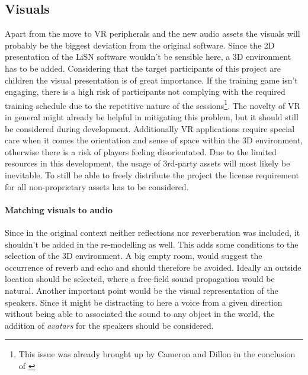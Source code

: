 \documentclass[a4paper,11pt]{article}%
\renewcommand{\\}{\vspace*{0.5\baselineskip} \newline}
\begin{document}
\subsection{Visuals}
\label{sec:visuals}
Apart from the move to \ac{VR} peripherals and the new audio assets the visuals will probably be the biggest deviation from the original software. Since the 2D presentation of the \ac{LiSN} software wouldn't be sensible here, a 3D environment has to be added.
\newline
\newline
Considering that the target participants of this project are children the visual presentation is of great importance. If the training game isn't engaging, there is a high risk of participants not complying with the required training schedule due to the repetitive nature of the sessions\footnote{This issue was already brought up by Cameron and Dillon in the conclusion of \cite{LiSN-B}}.
\newline
\newline
The novelty of \ac{VR} in general might already be helpful in mitigating this problem, but it should still be considered during development. Additionally \ac{VR} applications require special care when it comes the orientation and sense of space within the 3D environment, otherwise there is a risk of players feeling disorientated.
\newline
\newline
Due to the limited resources in this development, the usage of 3rd-party assets will most likely be inevitable. To still be able to freely distribute the project the license requirement for all non-proprietary assets has to be considered.


\paragraph{Matching visuals to audio} Since in the original context neither reflections nor reverberation was included, it shouldn't be added in the re-modelling as well. This adds some conditions to the selection of the 3D environment. A big empty room, would suggest the occurrence of reverb and echo and should therefore be avoided. Ideally an outside location should be selected, where a free-field sound propagation would be natural. Another important point would be the visual representation of the speakers. Since it might be distracting to here a voice from a given direction without being able to associated the sound to any object in the world, the addition of \textit{avatars} for the speakers should be considered.
\end{document}
